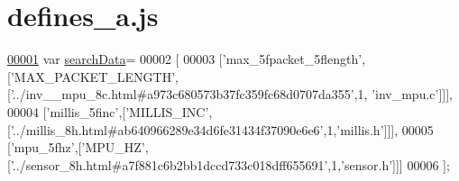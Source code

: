 \hypertarget{defines__a_8js_source}{}\section{defines\+\_\+a.\+js}
\label{defines__a_8js_source}

\begin{DoxyCode}
\hypertarget{defines__a_8js_source.tex_l00001}{}\hyperlink{defines__a_8js_ad01a7523f103d6242ef9b0451861231e}{00001} var \hyperlink{defines__a_8js_ad01a7523f103d6242ef9b0451861231e}{searchData}=
00002 [
00003   [\textcolor{stringliteral}{'max\_5fpacket\_5flength'},[\textcolor{stringliteral}{'MAX\_PACKET\_LENGTH'},[\textcolor{stringliteral}{'../inv\_\_mpu\_8c.html#a973c680573b37fc359fc68d0707da355'},1,\textcolor{stringliteral}{
      'inv\_mpu.c'}]]],
00004   [\textcolor{stringliteral}{'millis\_5finc'},[\textcolor{stringliteral}{'MILLIS\_INC'},[\textcolor{stringliteral}{'../millis\_8h.html#ab640966289e34d6fe31434f37090e6e6'},1,\textcolor{stringliteral}{'millis.h'}]]],
00005   [\textcolor{stringliteral}{'mpu\_5fhz'},[\textcolor{stringliteral}{'MPU\_HZ'},[\textcolor{stringliteral}{'../sensor\_8h.html#a7f881c6b2bb1dccd733c018dff655691'},1,\textcolor{stringliteral}{'sensor.h'}]]]
00006 ];
\end{DoxyCode}

